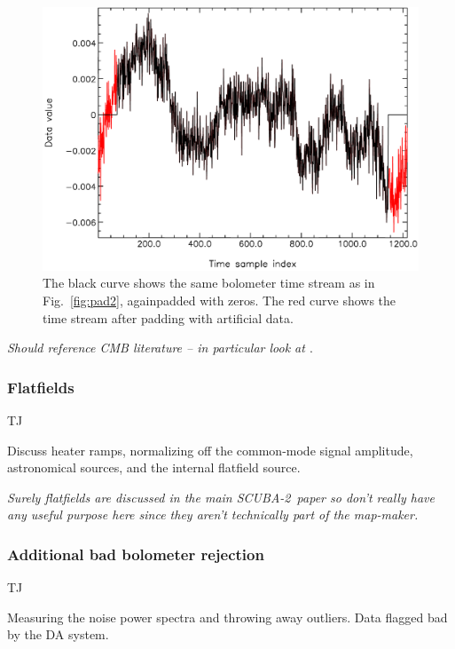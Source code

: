\documentclass[useAMS,usenatbib,nofootinbib]{mn2e}
\newcommand{\scuba}{SCUBA-2}
\begin{document}
\begin{itemize}
\begin{figure}
\centering
\includegraphics[width=\linewidth]{pad1.pdf}
\caption{The black curve shows the same bolometer time stream as in
Fig.~\ref{fig:pad2}, againpadded with zeros. The red curve shows the time stream
after padding with artificial data.}
\label{fig:pad1}
\end{figure}

\end{itemize}

\emph{Should reference CMB literature -- in particular look at
\citet{stompor2002}}.

\subsubsection{Flatfields}
\label{sec:flatfields}

TJ

Discuss heater ramps, normalizing off the common-mode signal
amplitude, astronomical sources, and the internal flatfield source.

\textit{Surely flatfields are discussed in the main \scuba\ paper so
don't really have any useful purpose here since they aren't
technically part of the map-maker.}

\subsubsection{Additional bad bolometer rejection}

TJ

Measuring the noise power spectra and throwing away outliers. Data
flagged bad by the DA system.
\end{document}

